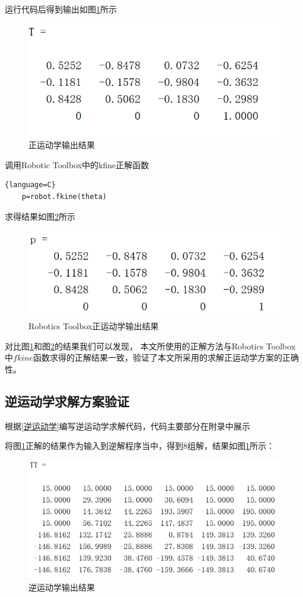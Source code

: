 \documentclass{seuthesis-2022}
\numberwithin{equation}{section}
\begin{document}
运行代码后得到输出如图\ref{fig:正运动学输出结果}所示

\begin{figure}[H]
  \centering
  \includegraphics[width=0.5\linewidth]{fig/正运动学输出结果.png}
  \caption{正运动学输出结果}
  \label{fig:正运动学输出结果}
\end{figure}

调用Robotic Toolbox中的kfine正解函数
\begin{lstlisting}{language=C}
    p=robot.fkine(theta)
\end{lstlisting}

求得结果如图\ref{fig:Robotics Toolbox正运动学输出结果}所示
\begin{figure}[H]
  \centering
  \includegraphics[width=0.5\linewidth]{fig/Robotics Toolbox正运动学输出结果.png}
  \caption{Robotics Toolbox正运动学输出结果}
  \label{fig:Robotics Toolbox正运动学输出结果}
\end{figure}

对比图\ref{fig:正运动学输出结果}和图\ref{fig:Robotics Toolbox正运动学输出结果}的结果我们可以发现，
本文所使用的正解方法与Robotics Toolbox中$fkine$函数求得的正解结果一致，验证了本文所采用的求解正运动学方案的正确性。

\subsection{逆运动学求解方案验证}
根据\ref{逆运动学}编写逆运动学求解代码，代码主要部分在附录中展示

将图\ref{fig:正运动学输出结果}正解的结果作为输入到逆解程序当中，得到8组解，结果如图\ref{fig:正运动学输出结果}所示：
\begin{figure}[H]
  \centering
  \includegraphics[width=0.7\linewidth]{fig/逆运动学输出结果.png}
  \caption{逆运动学输出结果}
  \label{fig:逆运动学输出结果}
\end{figure}
\end{document}
